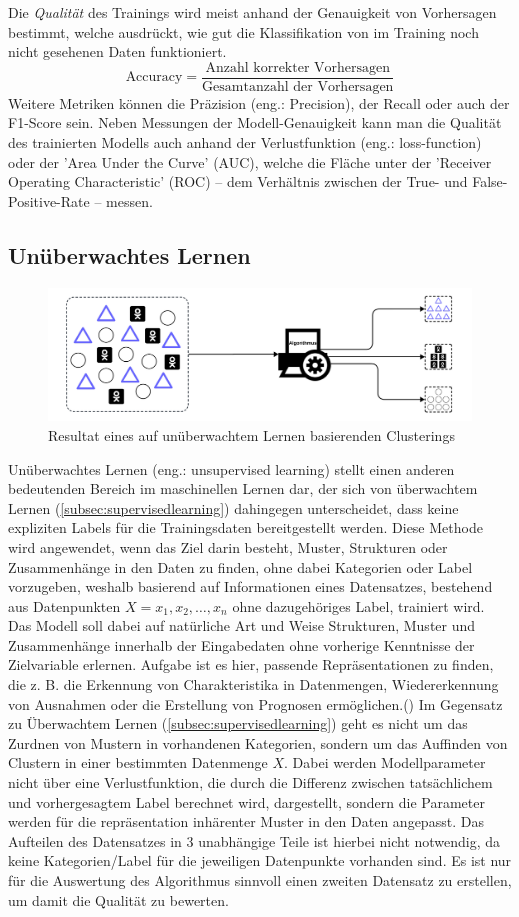 Die \textit{Qualität} des Trainings wird meist anhand der Genauigkeit von Vorhersagen bestimmt, welche ausdrückt, wie gut die Klassifikation von im Training noch nicht gesehenen Daten funktioniert.
\[
\text{Accuracy} = \frac{\text{Anzahl korrekter Vorhersagen}}{\text{Gesamtanzahl der Vorhersagen}}
\]
 Weitere Metriken können die Präzision (eng.: Precision), der Recall oder auch der F1-Score sein. Neben Messungen der Modell-Genauigkeit kann man die Qualität des trainierten Modells auch anhand der Verlustfunktion (eng.: loss-function) oder der 'Area Under the Curve' (AUC), welche die Fläche unter der 'Receiver Operating Characteristic' (ROC) -- dem Verhältnis zwischen der True- und False-Positive-Rate -- messen.
\subsection{Unüberwachtes Lernen}\label{subsec:unsupervisedlearning}
\begin{figure}[H]
	\centering
	\includegraphics[width=0.8\linewidth]{Bilder/unsupervised_sample.png}
	\caption{Resultat eines auf unüberwachtem Lernen basierenden Clusterings}
\end{figure}
Unüberwachtes Lernen (eng.: unsupervised learning) stellt einen anderen bedeutenden Bereich im maschinellen Lernen dar, der sich von überwachtem Lernen (\ref{subsec:supervisedlearning}) dahingegen unterscheidet, dass keine expliziten Labels für die Trainingsdaten bereitgestellt werden. Diese Methode wird angewendet, wenn das Ziel darin besteht, Muster, Strukturen oder Zusammenhänge in den Daten zu finden, ohne dabei Kategorien oder Label vorzugeben, weshalb basierend auf Informationen eines Datensatzes, bestehend aus Datenpunkten \textit{$X = x_1, x_2, \ldots, x_n$} ohne dazugehöriges Label, trainiert wird. Das Modell soll dabei auf natürliche Art und Weise Strukturen, Muster und Zusammenhänge innerhalb der Eingabedaten ohne vorherige Kenntnisse der Zielvariable erlernen. \glqq Aufgabe ist es hier, passende Repräsentationen zu finden, die z. B. die Erkennung von Charakteristika in Datenmengen, Wiedererkennung von Ausnahmen oder die Erstellung von Prognosen ermöglichen.\grqq (\cite[5]{lorenz_reinforcement_2020}) Im Gegensatz zu Überwachtem Lernen (\ref{subsec:supervisedlearning}) geht es nicht um das Zurdnen von Mustern in vorhandenen Kategorien, sondern um das Auffinden von Clustern in einer bestimmten Datenmenge $X$. Dabei werden Modellparameter nicht über eine Verlustfunktion, die durch die Differenz zwischen tatsächlichem und vorhergesagtem Label berechnet wird, dargestellt, sondern die Parameter werden für die repräsentation inhärenter Muster in den Daten angepasst. Das Aufteilen des Datensatzes in 3 unabhängige Teile ist hierbei nicht notwendig, da keine Kategorien/Label für die jeweiligen Datenpunkte vorhanden sind. Es ist nur für die Auswertung des Algorithmus sinnvoll einen zweiten Datensatz zu erstellen, um damit die Qualität zu bewerten.
